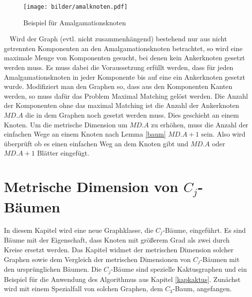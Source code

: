 \begin{figure}[h!]
		\centering 		 
   \texttt{[image: bilder/amalknoten.pdf]}
	\caption{Beispiel für Amalgamationsknoten}
  	 \label{amalbild}
  	 \end{figure}
  	 \vspace{-2mm}
  	 ~\linebreak
Wird der Graph (evtl. nicht zusammenhängend) bestehend nur aus nicht getrennten Komponenten an den Amalgamationsknoten betrachtet, so wird eine maximale Menge von Komponenten gesucht, bei denen kein Ankerknoten gesetzt werden muss. Es muss dabei die Voraussetzung erfüllt werden, dass für jeden Amalgamationsknoten in jeder Komponente bis auf eine ein Ankerknoten gesetzt wurde. Modifiziert man den Graphen so, dass aus den Komponenten Kanten werden, so muss dafür das Problem Maximal Matching gelöst werden.\newline
Die Anzahl der Komponenten ohne das maximal Matching ist die Anzahl der Ankerknoten $MD.A$ die in dem Graphen noch gesetzt werden muss. Dies geschieht an einem Knoten. Um die metrische Dimension um $MD.A$ zu erhöhen, muss die Anzahl der einfachen Wege an einem Knoten nach Lemma \ref{baum} $MD.A+1$ sein. Also wird überprüft ob es einen einfachen Weg an dem Knoten gibt und $MD.A$ oder $MD.A+1$ Blätter eingefügt.
\newpage
\chapter{Metrische Dimension von $C_j$-Bäumen}
\label{kapcjbaume}
\vspace{-2mm}
In diesem Kapitel wird eine neue Graphklasse, die $C_j$-Bäume, eingeführt. Es sind Bäume mit der Eigenschaft, dass Knoten mit größerem Grad als zwei durch Kreise ersetzt werden. Das Kapitel widmet der metrischen Dimension solcher Graphen sowie dem Vergleich der metrischen Dimensionen von $C_j$-Bäumen mit den ursprünglichen Bäumen. Die $C_j$-Bäume sind spezielle Kaktusgraphen und ein Beispiel für die Anwendung des Algorithmus aus Kapitel \ref{kapkaktus}. Zunächst wird mit einem Spezialfall von solchen Graphen, dem $C_3$-Baum, angefangen.
\vspace{-3mm}
